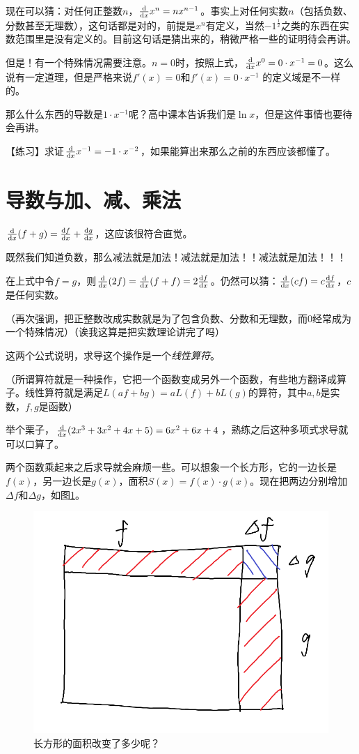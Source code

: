 现在可以猜：对任何正整数$n$，$\frac{\mathop{}\!\mathrm{d}}{\mathop{}\!\mathrm{d} x} x^n=n x^{n-1}$。事实上对任何实数$n$（包括负数、分数甚至无理数），这句话都是对的，前提是$x^n$有定义，当然$-1^{\frac{1}{2}}$之类的东西在实数范围里是没有定义的。目前这句话是猜出来的，稍微严格一些的证明待会再讲。

但是！有一个特殊情况需要注意。$n=0$时，按照上式，$\frac{\mathop{}\!\mathrm{d}}{\mathop{}\!\mathrm{d} x} x^0=0 \cdot x^{-1}=0$。这么说有一定道理，但是严格来说$f'(x)=0$和$f'(x)=0 \cdot x^{-1}$ 的定义域是不一样的。

那么什么东西的导数是$1 \cdot x^{-1}$呢？高中课本告诉我们是$\ln x$，但是这件事情也要待会再讲。

【练习】求证$\frac{\mathop{}\!\mathrm{d}}{\mathop{}\!\mathrm{d} x} x^{-1}=-1 \cdot x^{-2}$，如果能算出来那么之前的东西应该都懂了。
\section{导数与加、减、乘法}
$\frac{\mathop{}\!\mathrm{d}}{\mathop{}\!\mathrm{d} x}(f+g)=\frac{\mathop{}\!\mathrm{d} f}{\mathop{}\!\mathrm{d} x}+\frac{\mathop{}\!\mathrm{d} g}{\mathop{}\!\mathrm{d} x}$，这应该很符合直觉。

既然我们知道负数，那么减法就是加法！减法就是加法！！减法就是加法！！！

在上式中令$f=g$，则$\frac{\mathop{}\!\mathrm{d}}{\mathop{}\!\mathrm{d} x}(2f)=\frac{\mathop{}\!\mathrm{d}}{\mathop{}\!\mathrm{d} x}(f+f)=2\frac{\mathop{}\!\mathrm{d} f}{\mathop{}\!\mathrm{d} x}$。仍然可以猜：$\frac{\mathop{}\!\mathrm{d}}{\mathop{}\!\mathrm{d} x}(c f)=c \frac{\mathop{}\!\mathrm{d} f}{\mathop{}\!\mathrm{d} x}$，$c$是任何实数。

（再次强调，把正整数改成实数就是为了包含负数、分数和无理数，而$0$经常成为一个特殊情况）（诶我这算是把实数理论讲完了吗）

这两个公式说明，求导这个操作是一个\emph{线性算符}。

（所谓算符就是一种操作，它把一个函数变成另外一个函数，有些地方翻译成算子。线性算符就是满足$L(a f+b g)=a L(f)+b L(g)$的算符，其中$a,b$是实数，$f,g$是函数）

举个栗子，$\frac{\mathop{}\!\mathrm{d}}{\mathop{}\!\mathrm{d} x}(2x^3+3x^2+4x+5)=6x^2+6x+4$，熟练之后这种多项式求导就可以口算了。

两个函数乘起来之后求导就会麻烦一些。可以想象一个长方形，它的一边长是$f(x)$，另一边长是$g(x)$，面积$S(x)=f(x) \cdot g(x)$。现在把两边分别增加$\Delta f$和$\Delta g$，如图\ref{fig-rect}。
\begin{figure}[htb]
\centering
\includegraphics[scale=0.5]{fig/rect.png}
\caption{长方形的面积改变了多少呢？}
\label{fig-rect}
\end{figure}

